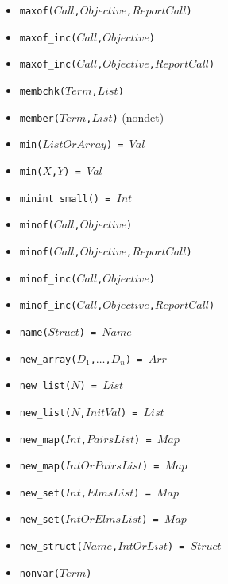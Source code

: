 \documentclass[10pt]{article}
\begin{document}
\begin{multicols}{2}
\begin{scriptsize}
\begin{itemize}
    \item \texttt{maxof($Call$,$Objective$,$ReportCall$)} 
    \item \texttt{maxof\_inc($Call$,$Objective$)} 
    \item \texttt{maxof\_inc($Call$,$Objective$,$ReportCall$)} 
    \item \texttt{membchk($Term$,$List$)} 
    \item \texttt{member($Term$,$List$)} (nondet)
    \item \texttt{min($ListOrArray$) = $Val$} 
    \item \texttt{min($X$,$Y$) = $Val$} 
    \item \texttt{minint\_small() = $Int$}
    \item \texttt{minof($Call$,$Objective$)} 
    \item \texttt{minof($Call$,$Objective$,$ReportCall$)} 
    \item \texttt{minof\_inc($Call$,$Objective$)} 
    \item \texttt{minof\_inc($Call$,$Objective$,$ReportCall$)} 
    \item \texttt{name($Struct$) = $Name$} 
    \item \texttt{new\_array($D_1$,$\ldots$,$D_n$) = $Arr$} 
    \item \texttt{new\_list($N$) = $List$} 
    \item \texttt{new\_list($N$,$InitVal$) = $List$} 
    \item \texttt{new\_map($Int$,$PairsList$) = $Map$} 
    \item \texttt{new\_map($IntOrPairsList$) = $Map$} 
    \item \texttt{new\_set($Int$,$ElmsList$) = $Map$} 
    \item \texttt{new\_set($IntOrElmsList$) = $Map$} 
    \item \texttt{new\_struct($Name$,$IntOrList$) = $Struct$} 
    \item \texttt{nonvar($Term$)} 

\end{itemize}
\end{scriptsize}
\end{multicols}
\end{document}
